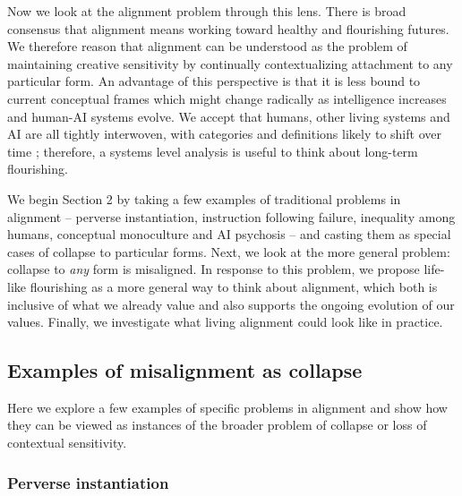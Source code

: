 \documentclass[12pt]{article}
\begin{document}

Now we look at the alignment problem through this lens. There is broad consensus that alignment means working toward healthy and flourishing futures. We therefore reason that alignment can be understood as the problem of maintaining creative sensitivity by continually contextualizing attachment to any particular form. An advantage of this perspective is that it is less bound to current conceptual frames which might change radically as intelligence increases and human-AI systems evolve. We accept that humans, other living systems and AI are all tightly interwoven, with categories and definitions likely to shift over time \citep{latour2012we, haraway2020staying, hayles2000we, bateson1972steps, folke2006resilience, douglas2012social}; therefore, a systems level analysis is useful to think about long-term flourishing.

We begin Section 2 by taking a few examples of traditional problems in alignment -- perverse instantiation, instruction following failure, inequality among humans, conceptual monoculture and AI psychosis -- and casting them as special cases of collapse to particular forms. Next, we look at the more general problem: collapse to \textit{any} form is misaligned. In response to this problem, we propose life-like flourishing as a more general way to think about alignment, which both is inclusive of what we already value and also supports the ongoing evolution of our values. Finally, we investigate what living alignment could look like in practice.



\subsection{Examples of misalignment as collapse}

Here we explore a few examples of specific problems in alignment and show how they can be viewed as instances of the broader problem of collapse or loss of contextual sensitivity.

\subsubsection{Perverse instantiation}
\end{document}
